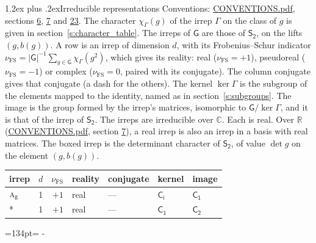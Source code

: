 \documentclass[10pt,a4paper]{article}
\makeatletter
\renewcommand\section{\@startsection{section}{1}{\z@}{-3ex plus -1ex minus -.2ex}%
  {1.2ex plus .2ex}{\normalfont\large\sffamily\bfseries\color{parttitle}}}
\newcommand{\needspace}[1]{\par\penalty-100\begingroup\dimen0=#1\relax\dimen2=\pagegoal
  \advance\dimen2-\pagetotal\ifdim\dimen0>\dimen2\relax\ifdim\dimen2>0pt\vfil\break\fi\fi
  \endgroup}
\numberwithin{equation}{section}
\newcommand{\grp}[1]{\mathsf{#1}}
\newcommand{\irr}[1]{\text{\normalfont\scshape #1}}
\newcommand{\detbox}[1]{{\setlength{\fboxsep}{1pt}\fbox{#1}}}
\newcommand{\ptag}[1]{\mathrm{#1}}
\newcommand{\irchar}[1]{\chi_{#1}}
\newcommand{\fsind}{\nu_{\mathrm{FS}}}
\makeatother
\begin{document}
\section{Irreducible representations}\label{s:irreps}
Conventions: \href{../../CONVENTIONS.pdf}{CONVENTIONS.pdf}, sections \href{../../../rotation/CONVENTIONS.pdf\#conv.6}{6}, \href{../../../rotation/CONVENTIONS.pdf\#conv.7}{7} and \href{../../CONVENTIONS.pdf\#conv.23}{23}.
\leavevmode\label{n:function.character}\label{n:irrep.Gamma}The character $\irchar{\Gamma}(g)$ of the irrep $\Gamma$ on the class of $g$ is given in section~\ref{s:character_table}. The irreps of $\grp{G}$ are those of \href{../../../rotation/data/pdf/S2.pdf}{$\grp{S_{2}}$}, on the lifts $(g, b(g))$.
\leavevmode\label{n:index.dimension}\label{n:index.frobenius}\label{n:head.irrep}\label{n:head.reality}A row is an irrep of dimension $d$, with its Frobenius--Schur indicator $\fsind = |\grp{G}|^{-1}\allowbreak\sum_{g\in\grp{G}}\irchar{\Gamma}(g^2)$, which gives its reality: real ($\fsind = +1$), pseudoreal ($\fsind = -1$) or complex ($\fsind = 0$, paired with its conjugate). \label{n:head.conjugate}The column conjugate gives that conjugate (a dash for the others). \label{n:head.kernel}The kernel $\ker\Gamma$ is the subgroup of the elements mapped to the identity, named as in section~\ref{s:subgroups}. \label{n:head.image}The image is the group formed by the irrep's matrices, isomorphic to $\grp{G}/\ker\Gamma$, and it is that of the irrep of \href{../../../rotation/data/pdf/S2.pdf}{$\grp{S_{2}}$}. The irreps are irreducible over $\mathbb{C}$. Each is real. Over $\mathbb{R}$ (\href{../../CONVENTIONS.pdf}{CONVENTIONS.pdf}, section \href{../../../rotation/CONVENTIONS.pdf\#conv.7}{7}), a real irrep is also an irrep in a basis with real matrices. \label{n:mark.determinant}The boxed irrep is the determinant character of \href{../../../rotation/data/pdf/S2.pdf}{$\grp{S_{2}}$}, of value $\det g$ on the element $(g, b(g))$.
\setlength{\emergencystretch}{2em}\par\setlength{\emergencystretch}{0pt}
{\small\renewcommand{\arraystretch}{1.25}\begin{longtable}{@{}lrrllll@{}}\toprule
irrep & $d$ & $\fsind$ & reality & conjugate & kernel & image\\\midrule\endhead
\bottomrule\endfoot\endlastfoot
$\irr{a}_{\ptag{g}}$ & 1 & $+1$ & real & --- & \href{S2.pdf}{$\grp{C_{i}}$} & \href{../../../rotation/data/pdf/C1.pdf}{$\grp{C_{1}}$}\\*
\detbox{$\irr{a}_{\ptag{u}}$} & 1 & $+1$ & real & --- & \href{C1.pdf}{$\grp{C_{1}}$} & \href{../../../rotation/data/pdf/C2.pdf}{$\grp{C_{2}}$}\\
\bottomrule\end{longtable}}
\needspace{134pt}
\end{document}
